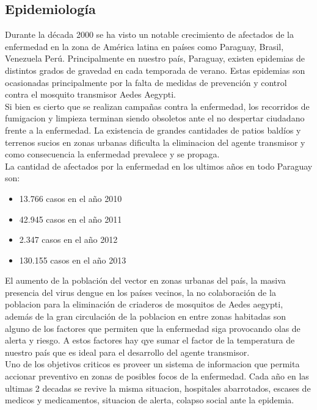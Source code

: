 
\subsection{Epidemiología}

Durante la década 2000 se ha visto un notable crecimiento de afectados de la enfermedad en la zona de América latina en países como Paraguay, Brasil, Venezuela Perú. Principalmente en nuestro país, Paraguay, existen epidemias  de distintos grados de gravedad en cada temporada de verano. Estas epidemias son ocasionadas principalmente por la falta de medidas de prevención y control contra el mosquito transmisor Aedes Aegypti.\\

Si bien es cierto que se realizan campañas contra la enfermedad, los recorridos de fumigacion y limpieza terminan siendo obsoletos ante el no despertar ciudadano frente a la enfermedad. La existencia de grandes cantidades de patios baldíos y terrenos sucios en zonas urbanas dificulta la eliminacion del agente transmisor y como consecuencia la enfermedad prevalece y se propaga.\\

La cantidad de afectados por la enfermedad en los ultimos años en todo Paraguay son:
\begin{itemize}
\item 13.766 casos en el año 2010
\item 42.945 casos en el año 2011
\item 2.347 casos en el año 2012
\item 130.155 casos en el año 2013\\
\end{itemize}

El aumento de la población del vector en zonas urbanas del país, la masiva presencia del virus dengue en los países vecinos, la no colaboración de la poblacion para la eliminación de criaderos de mosquitos de Aedes aegypti, además de la gran circulación de la poblacion en entre zonas habitadas son alguno de los factores que permiten que la enfermedad siga provocando olas de alerta y riesgo. A estos factores hay qye sumar el factor de la temperatura de nuestro país que es ideal para el desarrollo del agente transmisor.\\


Uno de los objetivos criticos es proveer un sistema de informacion que permita accionar preventivo en zonas de posibles focos de la enfermedad. Cada año en las ultimas 2 decadas se revive la misma situacion, hospitales abarrotados, escases de medicos y medicamentos, situacion de alerta, colapso social ante la epidemia.\\

